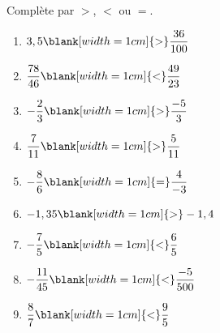 %
%
  Complète par $>$, $<$ ou $=$.
  \begin{enumerate}[cols=3]
    \item $3,5\blank[width=1cm]{>}\dfrac{36}{100}$
    \item $\dfrac{78}{46}\blank[width=1cm]{<}\dfrac{49}{23}$
    \item $-\dfrac{2}{3}\blank[width=1cm]{>}\dfrac{-5}{3}$
    \item $\dfrac{7}{11}\blank[width=1cm]{>}\dfrac{5}{11}$
    \item $-\dfrac{8}{6}\blank[width=1cm]{=}\dfrac{4}{-3}$
    \item $-1,35\blank[width=1cm]{>}-1,4$
    \item $-\dfrac{7}{5}\blank[width=1cm]{<}\dfrac{6}{5}$
    \item $-\dfrac{11}{45}\blank[width=1cm]{<}\dfrac{-5}{500}$
    \item $\dfrac{8}{7}\blank[width=1cm]{<}\dfrac{9}{5}$
  \end{enumerate}
